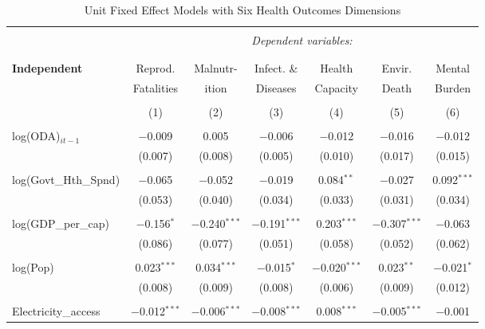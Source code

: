
\renewcommand{\arraystretch}{0.85} %


\begin{table}[!htbp] \centering 
  \caption{Unit Fixed Effect Models with Six Health Outcomes Dimensions} 
  \label{fig:UnitFEmodel} 
\begin{tabular}{@{\extracolsep{-3pt}}lcccccc} 
\\[-1.8ex]\hline 
\hline \\[-1.8ex] 
 & \multicolumn{6}{c}{\textit{Dependent variables:}} \\ 
\cline{2-7} 
\\[-1.8ex] & \multicolumn{6}{c}{ } \\ 
\textbf{Independent} & Reprod. & Malnutr-  & Infect. \& & Health & Envir. & Mental\\
& Fatalities & ition & Diseases & Capacity & Death & Burden \\
\\[-1.8ex] & (1) & (2) & (3) & (4) & (5) & (6)\\ 
\hline \\[-1.8ex] 
 log(ODA)$_{it-1}$ & $-$0.009 & 0.005 & $-$0.006 & $-$0.012 & $-$0.016 & $-$0.012 \\ 
  & (0.007) & (0.008) & (0.005) & (0.010) & (0.017) & (0.015) \\ 
  & & & & & & \\ 
 log(Govt\_Hth\_Spnd) & $-$0.065 & $-$0.052 & $-$0.019 & 0.084$^{**}$ & $-$0.027 & 0.092$^{***}$ \\ 
  & (0.053) & (0.040) & (0.034) & (0.033) & (0.031) & (0.034) \\ 
  & & & & & & \\ 
 log(GDP\_per\_cap) & $-$0.156$^{*}$ & $-$0.240$^{***}$ & $-$0.191$^{***}$ & 0.203$^{***}$ & $-$0.307$^{***}$ & $-$0.063 \\ 
  & (0.086) & (0.077) & (0.051) & (0.058) & (0.052) & (0.062) \\ 
  & & & & & & \\ 
 log(Pop) & 0.023$^{***}$ & 0.034$^{***}$ & $-$0.015$^{*}$ & $-$0.020$^{***}$ & 0.023$^{**}$ & $-$0.021$^{*}$ \\ 
  & (0.008) & (0.009) & (0.008) & (0.006) & (0.009) & (0.012) \\ 
  & & & & & & \\ 
 Electricity\_access & $-$0.012$^{***}$ & $-$0.006$^{***}$ & $-$0.008$^{***}$ & 0.008$^{***}$ & $-$0.005$^{***}$ & $-$0.001 \\ 

\end{tabular}
\end{table}

